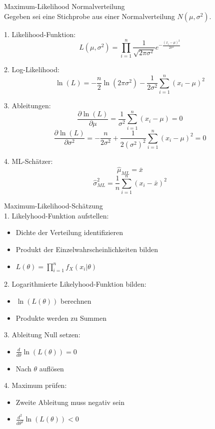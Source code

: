 \begin{example2}{Maximum-Likelihood Normalverteilung}\\
Gegeben sei eine Stichprobe aus einer Normalverteilung $N(\mu,\sigma^2)$.

1. Likelihood-Funktion:
$$L(\mu,\sigma^2)=\prod_{i=1}^n \frac{1}{\sqrt{2\pi\sigma^2}}e^{-\frac{(x_i-\mu)^2}{2\sigma^2}}$$

2. Log-Likelihood:
$$\ln(L)=-\frac{n}{2}\ln(2\pi\sigma^2)-\frac{1}{2\sigma^2}\sum_{i=1}^n(x_i-\mu)^2$$

3. Ableitungen:
$$\frac{\partial \ln(L)}{\partial \mu}=\frac{1}{\sigma^2}\sum_{i=1}^n(x_i-\mu)=0$$
$$\frac{\partial \ln(L)}{\partial \sigma^2}=-\frac{n}{2\sigma^2}+\frac{1}{2(\sigma^2)^2}\sum_{i=1}^n(x_i-\mu)^2=0$$

4. ML-Schätzer:
$$\hat{\mu}_{ML}=\bar{x}$$
$$\hat{\sigma}^2_{ML}=\frac{1}{n}\sum_{i=1}^n(x_i-\bar{x})^2$$
\end{example2}

\begin{KR}{Maximum-Likelihood-Schätzung}\\
1. Likelyhood-Funktion aufstellen:
   \begin{itemize}
     \item Dichte der Verteilung identifizieren
     \item Produkt der Einzelwahrscheinlichkeiten bilden
     \item $L(\theta) = \prod_{i=1}^n f_X(x_i|\theta)$
   \end{itemize}

2. Logarithmierte Likelyhood-Funktion bilden:
   \begin{itemize}
     \item $\ln(L(\theta))$ berechnen
     \item Produkte werden zu Summen
   \end{itemize}

3. Ableitung Null setzen:
   \begin{itemize}
     \item $\frac{d}{d\theta}\ln(L(\theta)) = 0$
     \item Nach $\theta$ auflösen
   \end{itemize}

4. Maximum prüfen:
   \begin{itemize}
     \item Zweite Ableitung muss negativ sein
     \item $\frac{d^2}{d\theta^2}\ln(L(\theta)) < 0$
   \end{itemize}
\end{KR}

